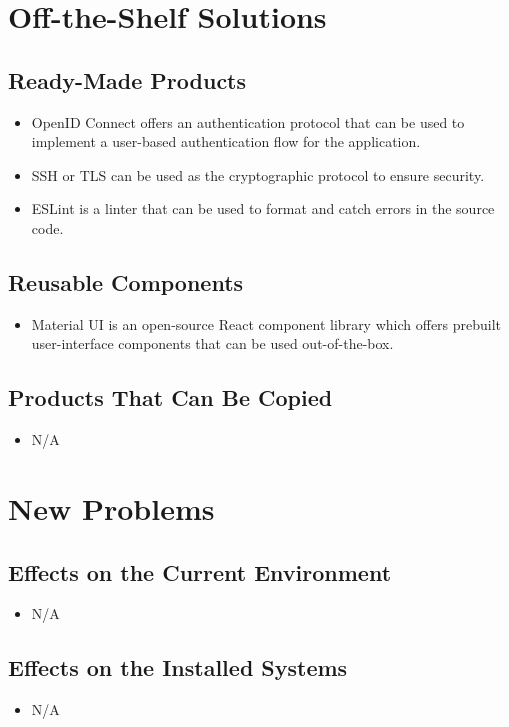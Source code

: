 \documentclass[12pt]{article}
\begin{document}
\section{Off-the-Shelf Solutions}
\subsection{Ready-Made Products}
\begin{itemize}
    \item OpenID Connect offers an authentication protocol that can be used to implement a user-based authentication flow for the application.
    \item SSH or TLS can be used as the cryptographic protocol to ensure security.
    \item ESLint is a linter that can be used to format and catch errors in the source code.
\end{itemize}

\subsection{Reusable Components}
\begin{itemize}
    \item Material UI is an open-source React component library which offers prebuilt user-interface components that can be used out-of-the-box.
\end{itemize}
\subsection{Products That Can Be Copied}
\begin{itemize}
    \item N/A
\end{itemize}

\section{New Problems}
\subsection{Effects on the Current Environment}
\begin{itemize}
    \item N/A
\end{itemize}

\subsection{Effects on the Installed Systems}
\begin{itemize}
    \item N/A
\end{itemize}
\end{document}
